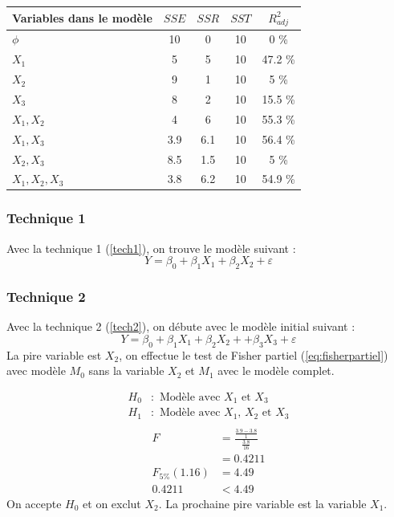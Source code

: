 \documentclass[11pt,french]{report}
\begin{document}
\begin{tabularx}{\linewidth}{|X|c|c|c|c|}
\hline
Variables dans le modèle & $SSE$ & $SSR$ & $SST$ & $R^2_{adj}$ \\
\hline
$\phi$ & 10 & 0 & 10 & 0 \% \\
$X_1$ & 5 & 5 & 10 & 47.2 \% \\
$X_2$ & 9 & 1 & 10 & 5 \% \\
$X_3$ & 8 & 2 & 10 & 15.5 \% \\
$X_1, X_2$ & 4 & 6 & 10 & 55.3 \% \\
$X_1, X_3$ & 3.9 & 6.1 & 10 & 56.4 \% \\
$X_2, X_3$ & 8.5 & 1.5 & 10 & 5 \% \\
$X_1, X_2, X_3$ & 3.8 & 6.2 & 10 & 54.9 \% \\
\hline
\end{tabularx}

\subsubsection*{Technique 1}
Avec la technique 1 (\ref{tech1}), on trouve le modèle suivant :
$$
Y = \beta_0 + \beta_1X_1 + \beta_2X_2 + \varepsilon
$$

\subsubsection*{Technique 2}
Avec la technique 2 (\ref{tech2}), on débute avec le modèle initial suivant :
$$
Y = \beta_0 + \beta_1X_1 + \beta_2X_2 + + \beta_3X_3 + \varepsilon
$$
La pire variable est $X_2$, on effectue le test de Fisher partiel (\ref{eq:fisherpartiel}) avec modèle $M_0$ sans la variable $X_2$ et $M_1$ avec le modèle complet. 

\begin{align*}
H_0 &: \text{ Modèle avec $X_1$ et $X_3$} \\
H_1 &: \text{ Modèle avec $X_1$, $X_2$ et $X_3$} \\
\end{align*}
\begin{align*}
F &= \frac{\frac{3.9-3.8}{1}}{\frac{3.8}{16}} \\
&= 0.4211 \\
F_{5 \%}(1.16) &= 4.49 \\
0.4211 &< 4.49
\end{align*}
On accepte $H_0$ et on exclut $X_2$. \newline
La prochaine pire variable est la variable $X_1$.
\end{document}
